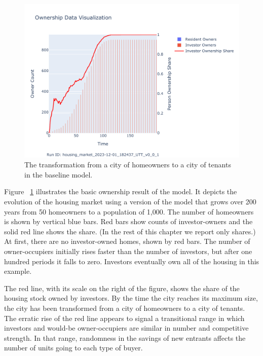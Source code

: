 {\begin{figure}[h!tb]
    \centering
    \hspace{4cm} %
    \includegraphics[scale=0.8, trim={0 1cm 0 1.8cm}, clip]{fig/Analysis/Ownership_Data_1.pdf}
    \caption{The transformation from a city of homeowners to a city of tenants in the baseline model.}
    \label{fig:Baseline_ownership_trajectory}
\end{figure}


Figure ~\ref{fig:Baseline_ownership_trajectory} illustrates the basic ownership result of the model. It depicts the evolution of the housing market using a version of the model that grows over 200 years from 50 homeowners to a population of 1,000. The number of homeowners is shown by vertical blue bars.  Red bars show counts of investor-owners and the solid red line shows the share. (In the rest of this chapter we report only shares.) 
At first, there are no investor-owned homes, shown by red bars. The number of owner-occupiers initially rises faster than the number of investors, but after one hundred periods it falls to zero. Investors eventually own all of the housing in this example. 
 
The red line, with its scale on the right of the figure, shows the share of the housing stock owned by investors. By the time the city reaches its maximum size, the city has been transformed from a city of homeowners to a city of tenants. The erratic rise of the red line appears to signal a transitional range in which investors and would-be owner-occupiers are similar in number and competitive strength. In that range, randomness in the savings of new entrants affects the number of units going to each type of buyer. 

}
